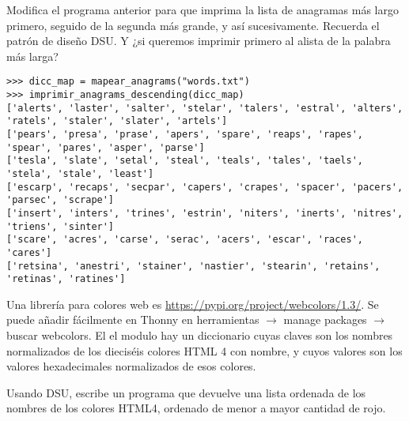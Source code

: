\begin{exercise}
Modifica el programa anterior para que imprima la lista de anagramas
más largo primero, seguido de la segunda más grande, y así sucesivamente. Recuerda el patrón de diseño DSU. Y ¿si queremos imprimir primero al alista de la palabra más larga?

\begin{footnotesize}
\begin{Verbatim}
>>> dicc_map = mapear_anagrams("words.txt")
>>> imprimir_anagrams_descending(dicc_map)
['alerts', 'laster', 'salter', 'stelar', 'talers', 'estral', 'alters', 'ratels', 'staler', 'slater', 'artels']
['pears', 'presa', 'prase', 'apers', 'spare', 'reaps', 'rapes', 'spear', 'pares', 'asper', 'parse']
['tesla', 'slate', 'setal', 'steal', 'teals', 'tales', 'taels', 'stela', 'stale', 'least']
['escarp', 'recaps', 'secpar', 'capers', 'crapes', 'spacer', 'pacers', 'parsec', 'scrape']
['insert', 'inters', 'trines', 'estrin', 'niters', 'inerts', 'nitres', 'triens', 'sinter']
['scare', 'acres', 'carse', 'serac', 'acers', 'escar', 'races', 'cares']
['retsina', 'anestri', 'stainer', 'nastier', 'stearin', 'retains', 'retinas', 'ratines']
\end{Verbatim}
\end{footnotesize}

\end{exercise}

\begin{exercise}
Una librería para colores web es \url{https://pypi.org/project/webcolors/1.3/}. Se puede añadir fácilmente en Thonny en 
herramientas $\rightarrow$ manage packages $\rightarrow$ buscar webcolors.
El el modulo  hay un diccionario cuyas claves son los nombres normalizados de los dieciséis colores HTML 4 con nombre, y cuyos valores son los valores hexadecimales normalizados de esos colores.


Usando DSU, escribe un programa que devuelve una lista ordenada de los nombres de los colores HTML4, ordenado de menor a mayor cantidad de rojo.

\end{exercise}

